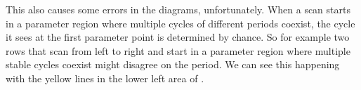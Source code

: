 This also causes some errors in the diagrams, unfortunately.
When a scan starts in a parameter region where multiple cycles of different periods coexist, the cycle it sees at the first parameter point is determined by chance.
So for example two rows that scan from left to right and start in a parameter region where multiple stable cycles coexist might disagree on the period.
We can see this happening with the yellow lines in the lower left area of .

